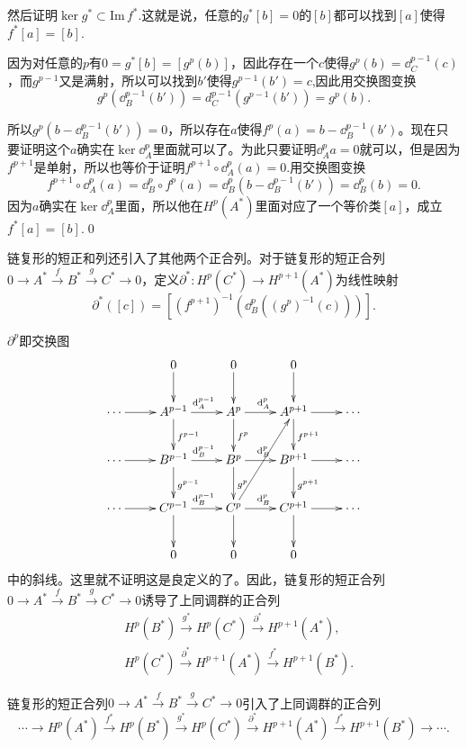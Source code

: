 然后证明$\ker g^*\subset \mathrm{Im}\, f^*$.这就是说，任意的$g^*[b]=0$的$[b]$都可以找到$[a]$使得$f^*[a]=[b]$.

因为对任意的$p$有$0=g^*[b]=[g^p(b)]$，因此存在一个$c$使得$g^p(b)=\dd^{p-1}_C(c)$，而$g^{p-1}$又是满射，所以可以找到$b'$使得$g^{p-1}(b')=c$,因此用交换图变换
\[
g^p(\dd^{p-1}_B(b'))=d^{p-1}_C(g^{p-1}(b'))=g^p(b).
\]

所以$g^p(b-\dd^{p-1}_B(b'))=0$，所以存在$a$使得$f^p(a)=b-\dd^{p-1}_B(b')$。现在只要证明这个$a$确实在$\ker \dd^p_A$里面就可以了。为此只要证明$\dd^p_A a=0$就可以，但是因为$f^{p+1}$是单射，所以也等价于证明$f^{p+1}\circ \dd^p_A (a)=0$.用交换图变换
\[
f^{p+1}\circ \dd^p_A (a)=\dd^p_B\circ f^p (a)=\dd^p_B(b-\dd^{p-1}_B(b'))=\dd^p_B(b)=0.
\]
因为$a$确实在$\ker \dd^p_A$里面，所以他在$H^p(A^*)$里面对应了一个等价类$[a]$，成立$f^*[a]=[b]$.\qed

\para 链复形的短正和列还引入了其他两个正合列。对于链复形的短正合列$
0\to A^*\xrightarrow{f}B^*\xrightarrow{g}C^*\to 0$，定义$\partial^*:H^p(C^*)\to H^{p+1}(A^*)$为线性映射
\[
	\partial^*([c])=\left[(f^{p+1})^{-1}\left(\dd^p_B\left((g^p)^{-1}(c)\right)\right)\right].
\]

$\partial^p$即交换图
	\[
		\xymatrix{
			&0\ar[d]&0\ar[d]&0\ar[d]&\\
			\cdots\ar[r]&A^{p-1}\ar[r]^{\dd_A^{p-1}}\ar[d]^{f^{p-1}}&A^p\ar[r]^{\dd_A^p}\ar[d]^{f^{p}}&A^{p+1}\ar[r]\ar[d]^{f^{p+1}}&\cdots\\
			\cdots\ar[r]&B^{p-1}\ar[r]^{\dd_B^{p-1}}\ar[d]^{g^{p-1}}&B^p\ar[r]^{\dd_B^p}\ar[d]^{g^{p}}&B^{p+1}\ar[r]\ar[d]^{g^{p+1}}&\cdots\\
			\cdots\ar[r]&C^{p-1}\ar[r]^{\dd_B^{p-1}}\ar[d]&C^p\ar[r]^{\dd_B^p}\ar[d]\ar[ruu]&C^{p+1}\ar[r]\ar[d]&\cdots\\
			&0&0&0&
		}
	\]
中的斜线。这里就不证明这是良定义的了。因此，链复形的短正合列$0\to A^*\xrightarrow{f}B^*\xrightarrow{g}C^*\to 0$诱导了上同调群的正合列
\[
\begin{aligned}
&H^p(B^*)\xrightarrow{g^*}H^p(C^*)\xrightarrow{\partial^*}H^{p+1}(A^*),\\
&H^p(C^*)\xrightarrow{\partial^*}H^{p+1}(A^*)\xrightarrow{f^*}H^{p+1}(B^*).
\end{aligned}
\]

\theo \label{longexact}
链复形的短正合列$0\to A^*\xrightarrow{f}B^*\xrightarrow{g}C^*\to 0$引入了上同调群的正合列
\[
\cdots\to H^p(A^*)\xrightarrow{f^*}H^p(B^*)\xrightarrow{g^*}H^p(C^*)\xrightarrow{\partial^*}H^{p+1}(A^*)\xrightarrow{f^*}H^{p+1}(B^*)\to\cdots.
\]

